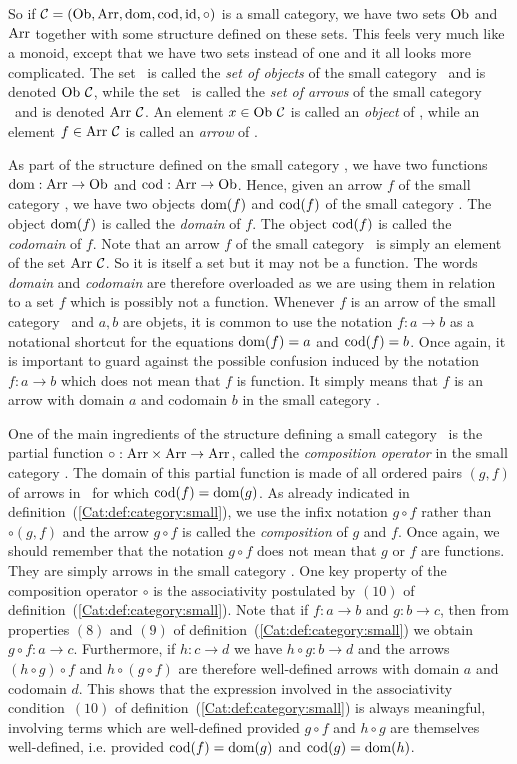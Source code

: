 So if $\mbox{$\cal C$}=(\mbox{\rm Ob}, \mbox{\rm Arr}, \mbox{\rm dom}, \mbox{\rm cod}, \mbox{\rm id}, \circ)$ is a small category, we have
two sets $\mbox{\rm Ob}$ and $\mbox{\rm Arr}$ together with some structure defined on these sets.
This feels very much like a monoid, except that we have two sets instead of one
and it all looks more complicated. The set \ob\ is called the {\em set of 
objects} of the small category \Cat\ and is denoted $\mbox{\rm Ob}\ \mbox{$\cal C$}$, while the set 
\arr\ is called the {\em set of arrows} of the small category \Cat\ and is 
denoted $\mbox{\rm Arr}\ \mbox{$\cal C$}$. An element $x\in\mbox{\rm Ob}\ \mbox{$\cal C$}$ is called an {\em object} 
of \Cat, while an element $f\in\mbox{\rm Arr}\ \mbox{$\cal C$}$ is called an {\em arrow} of \Cat.

As part of the structure defined on the small category \Cat, we have two
functions $\mbox{\rm dom}:\mbox{\rm Arr}\to\mbox{\rm Ob}$ and $\mbox{\rm cod}:\mbox{\rm Arr}\to\mbox{\rm Ob}$. Hence, given an arrow $f$
of the small category \Cat, we have two objects $\mbox{\rm dom}(f)$ and $\mbox{\rm cod}(f)$ of the
small category \Cat. The object $\mbox{\rm dom}(f)$ is called the {\em domain} of $f$. 
The object $\mbox{\rm cod}(f)$ is called the {\em codomain} of $f$. Note that an arrow $f$ 
of the small category \Cat\ is simply an element of the set $\mbox{\rm Arr}\ \mbox{$\cal C$}$. So it 
is itself a set but it may not be a function. The words {\em domain} and 
{\em codomain} are therefore overloaded as we are using them in relation to a 
set $f$ which is possibly not a function. Whenever $f$ is an arrow of the small 
category  \Cat\ and $a,b$ are objets, it is common to use the notation $f:a\to b$ 
as a notational shortcut for the equations $\mbox{\rm dom}(f)=a$ and $\mbox{\rm cod}(f)=b$. Once
again, it is important to guard against the possible confusion induced 
by the notation $f:a\to b$ which does not mean that $f$ is function. It 
simply means that $f$ is an arrow with domain $a$ and codomain $b$ in the 
small category \Cat. 

One of the main ingredients of the structure defining
a small category \Cat\ is the partial function $\circ:\mbox{\rm Arr}\times\mbox{\rm Arr}\to\mbox{\rm Arr}$,
called the {\em composition operator} in the small category \Cat. The domain
of this partial function is made of all ordered pairs $(g,f)$ of arrows in
\Cat\ for which $\mbox{\rm cod}(f)=\mbox{\rm dom}(g)$. As already indicated in 
definition~(\ref{Cat:def:category:small}), we use the infix notation $g\circ f$
rather than $\circ(g,f)$ and the arrow $g\circ f$ is called the {\em composition}
of $g$ and $f$. Once again, we should remember that the notation $g\circ f$ does
not mean that $g$ or $f$ are functions. They are simply arrows in the small
category \Cat. One key property of the composition operator $\circ$ is the 
associativity postulated by $(10)$ of definition~(\ref{Cat:def:category:small}).
Note that if $f:a\to b$ and $g:b\to c$, then from properties $(8)$ and $(9)$ of
definition~(\ref{Cat:def:category:small}) we obtain $g\circ f:a\to c$. 
Furthermore, if $h:c\to d$ we have $h\circ g:b\to d$ and the arrows 
$(h\circ g)\circ f$ and $h\circ(g\circ f)$ are therefore well-defined arrows
with domain $a$ and codomain $d$. This shows that the expression involved
in the associativity condition~$(10)$ of definition~(\ref{Cat:def:category:small})
is always meaningful, involving terms which are well-defined provided
$g\circ f$ and $h\circ g$ are themselves well-defined, i.e. provided
$\mbox{\rm cod}(f)=\mbox{\rm dom}(g)$ and $\mbox{\rm cod}(g)=\mbox{\rm dom}(h)$. 

